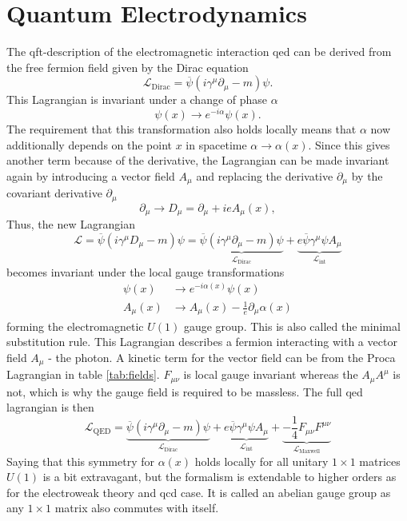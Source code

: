 \section{Quantum Electrodynamics}\label{sec:qed}
The \ac{qft}-description of the electromagnetic interaction \ac{qed} can be derived from the free fermion field given by the Dirac equation
\begin{equation}
    \mathcal{L}_\mathrm{Dirac} = \overline{\psi}(i \gamma^\mu \partial_\mu - m )\psi.
    \label{eq:dirac}
\end{equation}
This Lagrangian is invariant under a change of phase $\alpha$
\begin{equation}
    \psi(x) \rightarrow  e^{-i \alpha}\psi(x).
\end{equation}
The requirement that this transformation also holds locally means that $\alpha$ now additionally depends on the point $x$ in spacetime $\alpha \rightarrow \alpha(x)$. Since this gives another term because of the derivative, the Lagrangian can be made invariant again by introducing a vector field $A_\mu$ and replacing the derivative $\partial_\mu$ by the covariant derivative $\partial_\mu$
\begin{equation}
    \partial_\mu \rightarrow D_\mu = \partial_\mu + ie A_\mu(x),
    \label{eq:cov_diff}
\end{equation}
Thus, the new Lagrangian
\begin{equation}
    \mathcal{L} = \overline{\psi}(i \gamma^\mu D_\mu - m )\psi
    =
    \underbrace{\overline{\psi}(i \gamma^\mu \partial_\mu - m )\psi}_{\mathcal{L}_\mathrm{Dirac} }
    +
    \underbrace{ e\overline{\psi} \gamma^\mu {\psi}A_\mu}_{\mathcal{L}_\mathrm{int}}
\end{equation}
becomes invariant under the local gauge transformations
\begin{align}
    \psi(x)  & \rightarrow  e^{-i \alpha(x)}\psi(x)                      \\
    A_\mu(x) & \xrightarrow{} A_\mu(x) -\frac{1}{e}\partial_\mu\alpha(x)
\end{align}
forming the electromagnetic $U(1)$ gauge group. This is also called the minimal substitution rule. This Lagrangian describes a fermion interacting with a vector field $A_\mu$ - the photon. A kinetic term for the vector field can be from the Proca Lagrangian in table \ref{tab:fields}. $F_{\mu\nu}$ is local gauge invariant whereas the $A_\mu A^\mu$ is not, which is why the gauge field is required to be massless. The full \ac{qed} lagrangian is then
\begin{equation}
    \mathcal{L}_\mathrm{QED}
    =
    \underbrace{\overline{\psi}(i \gamma^\mu \partial_\mu - m )\psi}_{\mathcal{L}_\mathrm{Dirac} }
    +
    \underbrace{ e\overline{\psi} \gamma^\mu {\psi}A_\mu}_{\mathcal{L}_\mathrm{int}}
    +
    \underbrace{-\frac{1}{4}F_{\mu\nu}F^{\mu\nu}}_{\mathcal{L}_\mathrm{Maxwell} }
\end{equation}
Saying that this symmetry for $\alpha(x)$ holds locally for all unitary $1\times1$  matrices $U(1)$ is a bit extravagant, but the formalism is extendable to higher orders as for the electroweak theory and \ac{qcd} case. It is called an abelian gauge group as any $1\times1$ matrix also commutes with itself.

